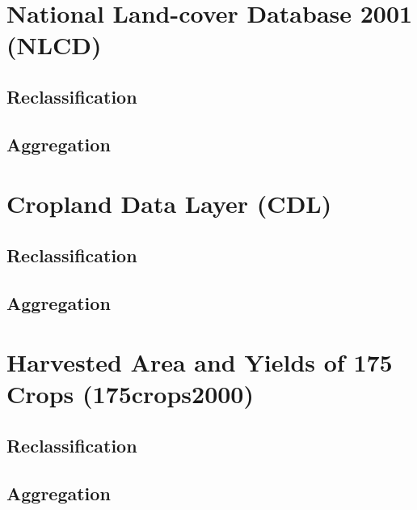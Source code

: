 \section{National Land-cover Database 2001 (NLCD)}
\label{sec:nlcd}

\subsection{Reclassification}
\label{sec:nlcd-reclass}


\subsection{Aggregation}
\label{sec:nlcd-aggr}


\section{Cropland Data Layer (CDL)}
\label{sec:cdl}


\subsection{Reclassification}
\label{sec:cdl-reclass}


\subsection{Aggregation}
\label{sec:cdl-aggr}


\section{Harvested Area and Yields of 175 Crops (175crops2000)}
\label{sec:175crops2000}





\subsection{Reclassification}
\label{sec:cdl-reclass}


\subsection{Aggregation}
\label{sec:cdl-aggr}
